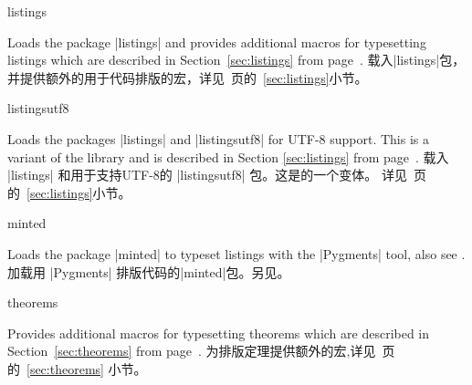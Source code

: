 \begin{docTcbKey}[library]{listings}{}{}
\begin{stripedbox}
Loads the package |listings| %
and provides additional macros for typesetting listings which are described in Section~\ref{sec:listings} from page~\pageref{sec:listings}.
\tcblower
载入|listings|包，并提供额外的用于代码排版的宏，详见~\pageref{sec:listings}页的~\ref{sec:listings}小节。
\end{stripedbox}
\end{docTcbKey}

\begin{docTcbKey}[library]{listingsutf8}{}{}
\begin{stripedbox}
Loads the packages |listings| %
 and |listingsutf8| %
  for UTF-8 support.
This is a variant of the library 
and is described in Section \ref{sec:listings}
from page~\pageref{sec:listings}.
\tcblower
载入 |listings| 和用于支持UTF-8的 |listingsutf8| 包。这是的一个变体。%
详见~\pageref{sec:listings}页的~\ref{sec:listings}小节。
\end{stripedbox}
\end{docTcbKey}



\begin{docTcbKey}[library]{minted}{}{}
\begin{stripedbox}
Loads the package |minted| %
to typeset listings with the |Pygments| %
 tool, also see .
\tcblower
加载用 |Pygments| %
排版代码的|minted|包。另见。
\end{stripedbox}
\end{docTcbKey}

\begin{docTcbKey}[library]{theorems}{}{}
\begin{stripedbox}
Provides additional
macros for typesetting theorems which are described in Section~\ref{sec:theorems}
from page~\pageref{sec:theorems}.
\tcblower
为排版定理提供额外的宏,详见~\pageref{sec:theorems}页的~\ref{sec:theorems} 小节。
\end{stripedbox}
\end{docTcbKey}

